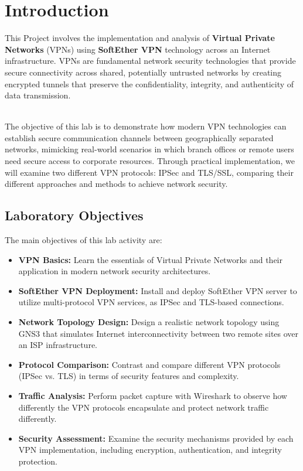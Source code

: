 \newpage

\section{Introduction}

This Project involves the implementation and analysis of \textbf{Virtual Private Networks} (VPNs) using \textbf{SoftEther VPN} technology across an Internet infrastructure. VPNs are fundamental network security technologies that provide secure connectivity across shared, potentially untrusted networks by creating encrypted tunnels that preserve the confidentiality, integrity, and authenticity of data transmission.

\noindent
\\
The objective of this lab is to demonstrate how modern VPN technologies can establish secure communication channels between geographically separated networks, mimicking real-world scenarios in which branch offices or remote users need secure access to corporate resources. Through practical implementation, we will examine two different VPN protocols: IPSec and TLS/SSL, comparing their different approaches and methods to achieve network security.

\subsection{Laboratory Objectives}

The main objectives of this lab activity are:

\begin{itemize}
    \item \textbf{VPN Basics:} Learn the essentials of Virtual Private Networks and their application in modern network security architectures.
    
    \item \textbf{SoftEther VPN Deployment:} Install and deploy SoftEther VPN server to utilize multi-protocol VPN services, as IPSec and TLS-based connections.
    
    \item \textbf{Network Topology Design:} Design a realistic network topology using GNS3 that simulates Internet interconnectivity between two remote sites over an ISP infrastructure.
    
    \item \textbf{Protocol Comparison:} Contrast and compare different VPN protocols (IPSec vs. TLS) in terms of security features and complexity.
    
    \item \textbf{Traffic Analysis:} Perform packet capture with Wireshark to observe how differently the VPN protocols encapsulate and protect network traffic differently.
    
    \item \textbf{Security Assessment:} Examine the security mechanisms provided by each VPN implementation, including encryption, authentication, and integrity protection.
\end{itemize}

